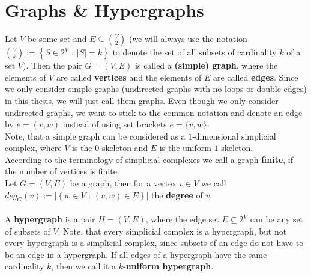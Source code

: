 \section{Graphs \& Hypergraphs}

Let \(V\) be some set and \(E\subseteq\binom{V}{2}\) (we will always use the notation\\
\(\binom{V}{k}:=\left\{S\in 2^V\text{ : }\left|S\right|=k\right\}\) to denote the set of all subsets of cardinality \(k\) of a set \(V\)). Then the pair \(G=\left(V,E\right)\) is called a \textbf{(simple) graph}, where the elements of \(V\) are called \textbf{vertices} and the elements of \(E\) are called \textbf{edges}. Since we only consider simple graphs (undirected graphs with no loops or double edges) in this thesis, we will just call them graphs. Even though we only consider undirected graphs, we want to stick to the common notation and denote an edge by \(e=(v,w)\) instead of using set brackets \(e=\{v,w\}\).\\
Note, that a simple graph can be considered as a \(1\)-dimensional simplicial complex, where \(V\) is the \(0\)-skeleton and \(E\) is the uniform \(1\)-skeleton.\\
According to the terminology of simplicial complexes we call a graph \textbf{finite}, if the number of vertices is finite.\\
Let \(G=(V,E)\) be a graph, then for a vertex \(v\in V\) we call\\
\(deg_G(v):=\left|\left\{w\in V\text{ : }(v,w)\in E\right\}\right|\) the \textbf{degree} of \(v\).\\
\\
A \textbf{hypergraph} is a pair \(H=(V,E)\), where the edge set \(E\subseteq 2^V\) can be any set of subsets of \(V\). Note, that every simplicial complex is a hypergraph, but not every hypergraph is a simplicial complex, since subsets of an edge do not have to be an edge in a hypergraph. If all edges of a hypergraph have the same cardinality \(k\), then we call it a \(k\)-\textbf{uniform hypergraph}.